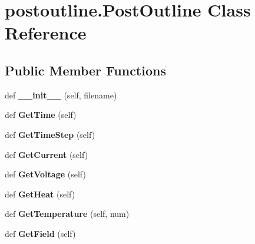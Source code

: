 \hypertarget{classpostoutline_1_1_post_outline}{}\section{postoutline.\+Post\+Outline Class Reference}
\label{classpostoutline_1_1_post_outline}
\subsection*{Public Member Functions}
\begin{DoxyCompactItemize}
\item 
\hypertarget{classpostoutline_1_1_post_outline_ae34d4458ded5e598fca3439cf7152142}{}def {\bfseries \+\_\+\+\_\+init\+\_\+\+\_\+} (self, filename)\label{classpostoutline_1_1_post_outline_ae34d4458ded5e598fca3439cf7152142}

\item 
\hypertarget{classpostoutline_1_1_post_outline_a8e2e9fb7f5fe24df3023d58b3e6378d9}{}def {\bfseries Get\+Time} (self)\label{classpostoutline_1_1_post_outline_a8e2e9fb7f5fe24df3023d58b3e6378d9}

\item 
\hypertarget{classpostoutline_1_1_post_outline_aca716786302d754dd1717aecc6481cea}{}def {\bfseries Get\+Time\+Step} (self)\label{classpostoutline_1_1_post_outline_aca716786302d754dd1717aecc6481cea}

\item 
\hypertarget{classpostoutline_1_1_post_outline_a6897247f763876a8aad27ccde2671f08}{}def {\bfseries Get\+Current} (self)\label{classpostoutline_1_1_post_outline_a6897247f763876a8aad27ccde2671f08}

\item 
\hypertarget{classpostoutline_1_1_post_outline_ab723956ec0ba39aeec88410359daa070}{}def {\bfseries Get\+Voltage} (self)\label{classpostoutline_1_1_post_outline_ab723956ec0ba39aeec88410359daa070}

\item 
\hypertarget{classpostoutline_1_1_post_outline_a29a39191fec2d2ab71ae3a8dcd292d94}{}def {\bfseries Get\+Heat} (self)\label{classpostoutline_1_1_post_outline_a29a39191fec2d2ab71ae3a8dcd292d94}

\item 
\hypertarget{classpostoutline_1_1_post_outline_a4bea44607d3266f1a0b8a4987f432bb3}{}def {\bfseries Get\+Temperature} (self, num)\label{classpostoutline_1_1_post_outline_a4bea44607d3266f1a0b8a4987f432bb3}

\item 
\hypertarget{classpostoutline_1_1_post_outline_abc24f55902f35b61df54c6d1544ac523}{}def {\bfseries Get\+Field} (self)\label{classpostoutline_1_1_post_outline_abc24f55902f35b61df54c6d1544ac523}

\end{DoxyCompactItemize}
